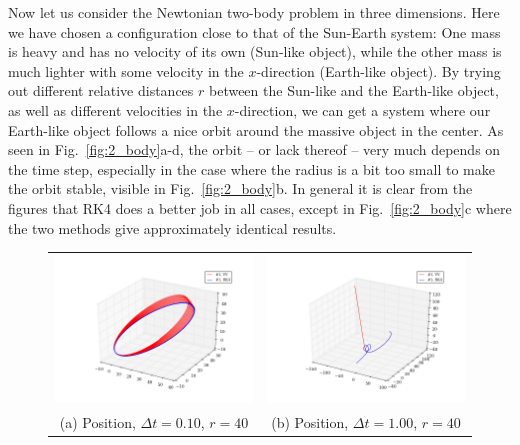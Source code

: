 \documentclass{article}
\begin{document}
\begin{multicols}{2}
Now let us consider the Newtonian two-body problem in three dimensions. Here we have chosen a configuration close to that of the Sun-Earth system: One mass is heavy and has no velocity of its own (Sun-like object), while the other mass is much lighter with some velocity in the $x$-direction (Earth-like object). By trying out different relative distances $r$ between the Sun-like and the Earth-like object, as well as different velocities in the $x$-direction, we can get a system where our Earth-like object follows a nice orbit around the massive object in the center. As seen in Fig.~\ref{fig:2_body}a-d, the orbit -- or lack thereof -- very much depends on the time step, especially in the case where the radius is a bit too small to make the orbit stable, visible in Fig.~\ref{fig:2_body}b. In general it is clear from the figures that RK4 does a better job in all cases, except in Fig.~\ref{fig:2_body}c where the two methods give approximately identical results. 

\begin{figure}
\begin{center}
\begin{tabular}{cc}
  	\includegraphics[width=90mm]{Images/comparison_orbit_01_dist40.png}
	& \includegraphics[width=90mm]{Images/comparison_orbit_1_dist40.png} \\
	(a) Position, $\Delta t = 0.10$, $r = 40$				& (b) Position, $\Delta t = 1.00$, $r = 40$  \\[6pt]
	

\end{tabular}
\end{center}
\end{figure}
\end{multicols}
\end{document}
